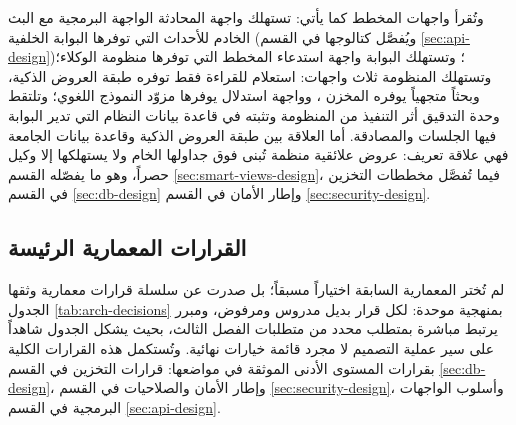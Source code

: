 وتُقرأ واجهات المخطط كما يأتي: تستهلك واجهة المحادثة الواجهة البرمجية  مع البث الخادم للأحداث  التي توفرها البوابة الخلفية (ويُفصَّل كتالوجها في القسم \ref{sec:api-design})؛ وتستهلك البوابة واجهة استدعاء المخطط  التي توفرها منظومة الوكلاء؛ وتستهلك المنظومة ثلاث واجهات: استعلام  للقراءة فقط توفره طبقة العروض الذكية، وبحثاً متجهياً يوفره المخزن ، وواجهة استدلال يوفرها مزوّد النموذج اللغوي؛ وتلتقط وحدة التدقيق أثر التنفيذ  من المنظومة وتثبته في قاعدة بيانات النظام التي تدير البوابة فيها الجلسات والمصادقة. أما العلاقة بين طبقة العروض الذكية وقاعدة بيانات الجامعة فهي علاقة تعريف: عروض علائقية منظمة تُبنى فوق جداولها الخام ولا يستهلكها إلا وكيل  حصراً، وهو ما يفصّله القسم \ref{sec:smart-views-design}، فيما تُفصَّل مخططات التخزين في القسم \ref{sec:db-design} وإطار الأمان في القسم \ref{sec:security-design}.

\subsection{القرارات المعمارية الرئيسة}
\label{subsec:arch-decisions}

لم تُختر المعمارية السابقة اختياراً مسبقاً؛ بل صدرت عن سلسلة قرارات معمارية وثقها الجدول \ref{tab:arch-decisions} بمنهجية موحدة: لكل قرار بديل مدروس ومرفوض، ومبرر يرتبط مباشرة بمتطلب محدد من متطلبات الفصل الثالث، بحيث يشكل الجدول شاهداً على سير عملية التصميم لا مجرد قائمة خيارات نهائية. وتُستكمل هذه القرارات الكلية بقرارات المستوى الأدنى الموثقة في مواضعها: قرارات التخزين في القسم \ref{sec:db-design}، وإطار الأمان والصلاحيات في القسم \ref{sec:security-design}، وأسلوب الواجهات البرمجية في القسم \ref{sec:api-design}.

